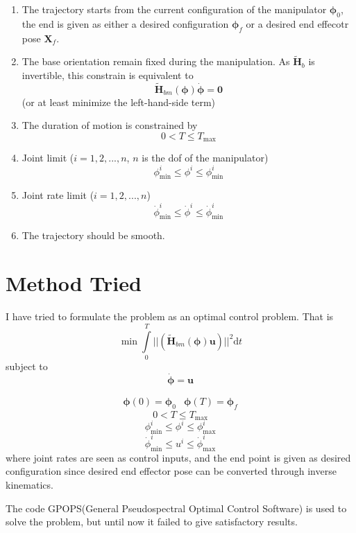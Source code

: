 \documentclass{article}
\begin{document}
\begin{enumerate}
	\item The trajectory starts from the current configuration of the manipulator $\bm{\phi}_0$, the end is given as either a desired configuration $\bm{\phi}_f$ or a desired end effecotr pose $\bm{X}_f$.
	\item The base orientation remain fixed during the manipulation. As $\tilde{\bm{H}}_b$ is invertible, this constrain is equivalent to 
	\begin{equation}
		\tilde{\bm{H}}_{bm}(\bm{\phi})\dot{\bm{\phi}} = \bm{0}
	\end{equation}
	(or at least minimize the left-hand-side term)
	\item The duration of motion is constrained by 
	\begin{equation}
		0 < T \le T_{\mathrm{max}}
	\end{equation}
	\item Joint limit ($i = 1,2,...,n$, $n$ is the dof of the manipulator)
	\begin{equation}
		\phi^i_{\mathrm{min}} \le \phi^i \le \phi^i_{\mathrm{min}}
	\end{equation}
	\item Joint rate limit ($i = 1,2,...,n$)
		\begin{equation}
		\dot{\phi}^i_{\mathrm{min}} \le \dot{\phi}^i \le \dot{\phi}^i_{\mathrm{min}}
		\end{equation}
	\item The trajectory should be smooth.
\end{enumerate}

\section{Method Tried}
I have tried to formulate the problem as an optimal control problem. That is 
	\begin{equation}
	\label{e:min}
		\min\int\limits_0^T||(\tilde{\bm{H}}_{bm}(\bm{\phi})\bm{u})||^2\mathrm{d}t
	\end{equation}
	subject to
	\begin{equation}
		\dot{\bm{\phi}} = \bm{u}
	\end{equation}
	
	\begin{equation}
	\begin{array}{rl}
		\bm{\phi}(0) = \bm{\phi}_0 & \bm{\phi}(T) = \bm{\phi}_f
	\end{array}	
	\end{equation}
	\begin{equation}
		0 < T \le T_{\mathrm{max}}
	\end{equation}
	\begin{equation}
		\phi^i_{\mathrm{min}} \le \phi^i \le \phi^i_{\mathrm{max}}
	\end{equation}
	\begin{equation}
		\dot{\phi}^i_{\mathrm{min}} \le {u}^i \le \dot{\phi}^i_{\mathrm{max}}
	\end{equation}
where joint rates are seen as control inputs, and the end point is given as desired configuration since desired end effector pose can be converted through inverse kinematics.

The code GPOPS(General Pseudospectral Optimal Control Software) is used to solve the problem, but until now it failed to give satisfactory results.



\end{document}

